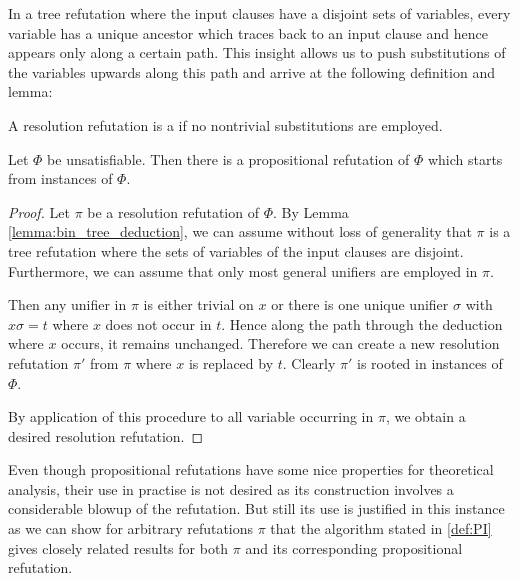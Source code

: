 In a tree refutation where the input clauses have a disjoint sets of variables, every variable has a unique ancestor which traces back to an input clause and hence appears only along a certain path.
This insight allows us to push substitutions of the variables upwards along this path and arrive at the following definition and lemma:




\begin{defi}
	A resolution refutation is a  if no nontrivial substitutions are employed.
\end{defi}

\begin{lemma}
	Let $\Phi$ be unsatisfiable.
	Then there is a propositional refutation of $\Phi$ which starts from instances of $\Phi$.
\end{lemma}
\begin{proof}
	Let $\pi$ be a resolution refutation of $\Phi$.
	By Lemma \ref{lemma:bin_tree_deduction}, we can assume without loss of generality that $\pi$ is a tree refutation where the sets of variables of the input clauses are disjoint.
	Furthermore, we can assume that only most general unifiers are employed in $\pi$.

	Then any unifier in $\pi$ is either trivial on $x$ or there is one unique unifier $\sigma$ with $x\sigma = t$ where $x$ does not occur in $t$.
	Hence along the path through the deduction where $x$ occurs, it remains unchanged.
	Therefore we can create a new resolution refutation $\pi'$ from $\pi$ where $x$ is replaced by $t$.
	Clearly $\pi'$ is rooted in instances of $\Phi$.

	By application of this procedure to all variable occurring in $\pi$, we obtain a desired resolution refutation.
\end{proof}

Even though propositional refutations have some nice properties for theoretical analysis, their use in practise is not desired as its construction involves a considerable blowup of the refutation. 
But still its use is justified in this instance as we can show for arbitrary refutations $\pi$
that the algorithm stated in \ref{def:PI} gives closely related results for both $\pi$ and its corresponding propositional refutation.

